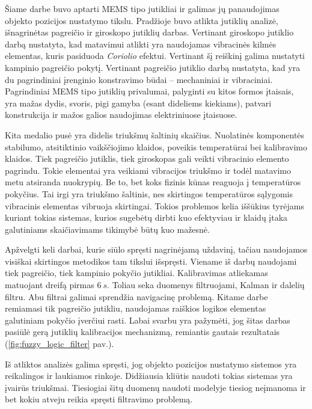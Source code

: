 Šiame darbe buvo aptarti MEMS tipo jutikliai ir galimas jų panaudojimas objekto pozicijos nustatymo tikslu. 
Pradžioje buvo atlikta jutiklių analizė, išnagrinėtas pagreičio ir giroskopo jutiklių darbas. 
Vertinant giroskopo jutiklio darbą nustatyta, kad matavimui atlikti yra naudojamas vibracinės kilmės elementas, kuris pasiduoda \textit{Coriolio} efektui. 
Vertinant šį reiškinį galima nustatyti kampinio pagreičio pokytį. 
Vertinant pagreičio jutiklio darbą nustatyta, kad yra du pagrindiniai įrenginio konstravimo būdai -- mechaniniai ir vibraciniai. 
Pagrindiniai MEMS tipo jutiklių privalumai, palyginti su kitos formos įtaisais, yra mažas dydis, svoris, pigi gamyba (esant dideliems kiekiams), patvari konstrukcija ir mažos galios naudojimas elektriniuose įtaisuose.

Kita medalio pusė yra didelis triukšmų šaltinių skaičius. 
Nuolatinės komponentės stabilumo, atsitiktinio vaikščiojimo klaidos, poveikis temperatūrai bei kalibravimo klaidos. 
Tiek pagreičio jutiklis, tiek giroskopas gali veikti vibracinio elemento pagrindu. 
Tokie elementai yra veikiami vibracijos triukšmo ir todėl matavimo metu atsiranda nuokrypių. 
Be to, bet koks fizinis kūnas reaguoja į temperatūros pokyčius. 
Tai irgi yra triukšmo šaltinis, nes skirtingos temperatūros sąlygomis vibracinis elementas vibruoja skirtingai. 
Tokios problemos kelia iššūkius tyrėjams kuriant tokias sistemas, kurios sugebėtų dirbti kuo efektyviau ir klaidų įtaka galutiniams skaičiavimams tikimybė būtų kuo mažesnė. 

Apžvelgti keli darbai, kurie siūlo spręsti nagrinėjamą uždavinį, tačiau naudojamos visiškai skirtingos metodikos tam tikslui išspręsti. 
Viename iš darbų naudojami tiek pagreičio, tiek kampinio pokyčio jutikliai. 
Kalibravimas atliekamas matuojant dreifą pirmas $6~s$. 
Toliau seka duomenys filtruojami, Kalman ir dalelių filtru. 
Abu filtrai galimai sprendžia navigacinę problemą. 
Kitame darbe remiamasi tik pagreičio jutikliu, naudojamas raiškios logikos elementas galutiniam pokyčio įverčiui rasti. 
Labai svarbu yra pažymėti, jog šitas darbas pasiūlė gerą jutiklių kalibracijos mechanizmą, remiantis gautais rezultatais (\ref{fig:fuzzy_logic_filter} pav.). 

Iš atliktos analizės galima spręsti, jog objekto pozicijos nustatymo sistemos yra reikalingos ir laukiamos rinkoje. 
Didžiausia kliūtis naudoti tokias sistemas yra įvairūs triukšmai. 
Tiesiogiai šitų duomenų naudoti modelyje tiesiog neįmanoma ir bet kokiu atveju reikia spręsti filtravimo problemą.

